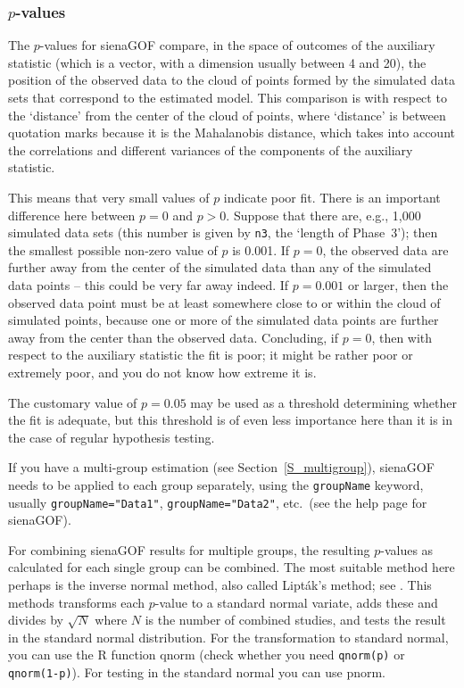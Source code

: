 \documentclass[a4paper,fleqn,11pt]{article}
\newcommand{\+}{\, + \,}
\newcommand{\sfn}[1]{\textsf{#1}}
\newcommand{\R}{{\sf R }}
\begin{document}
\subsubsection{$p$-values}
The $p$-values for \textsf{sienaGOF} compare, in the space of outcomes
of the auxiliary statistic (which is a vector,
with a dimension usually between 4 and 20),
the position of the observed data to the cloud of
points formed by the simulated data sets that correspond
to the estimated model. This comparison is with respect to the
`distance' from the center of the cloud of points,
where `distance' is between quotation marks because it is the
Mahalanobis distance, which takes into account the correlations
and different variances of the components of the auxiliary statistic.

This means that very small values of $p$ indicate poor fit.
There is an important difference here between $p=0$ and $p>0$.
Suppose that there are, e.g., 1,000 simulated data sets
(this number is given by \texttt{n3}, the `length of Phase~3');
then the smallest possible non-zero value of $p$ is 0.001.
If $p=0$, the observed data are further away from the center of
the simulated data than any of the simulated data points -- this
could be very far away indeed. If $p=0.001$ or larger, then
the observed data point must be at least somewhere close to or within the
cloud of simulated points, because one or more of the simulated data
points are further away from the center than the observed data.
Concluding, if $p=0$, then with respect to the auxiliary statistic
the fit is poor; it might be rather poor or extremely poor,
and you do not know how extreme it is.

The customary value of $p=0.05$ may be used as a threshold determining
whether the fit is adequate, but this threshold is of even less
importance here than it is in the case of regular hypothesis testing.

If you have a multi-group estimation (see Section~\ref{S_multigroup}),
\textsf{sienaGOF} needs to be applied to each group separately,
using the \texttt{groupName} keyword, usually
\texttt{groupName="Data1"},  \texttt{groupName="Data2"}, etc.\
(see the help page for \textsf{sienaGOF}).

For combining \textsf{sienaGOF} results for multiple groups,
the resulting $p$-values
as calculated for each single group can be combined.
The most suitable method here perhaps is the inverse normal method,
also called Lipt\'{a}k's method; see \citet[][Section C.3]{HedgesOlkin85}.
This methods transforms each $p$-value to a standard normal variate, adds these
and divides by $\sqrt{N}$ where $N$ is the number of combined studies,
and tests the result in the standard normal distribution.
For the transformation to standard normal,
you can use the \R function \sfn{qnorm}
(check whether you need \texttt{qnorm(p)} or \texttt{qnorm(1-p)}).
For testing in the standard normal you can use \sfn{pnorm}.
\end{document}
